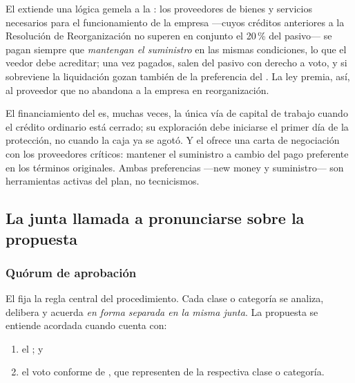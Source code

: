 El  extiende una lógica gemela a la : los proveedores
de bienes y servicios necesarios para el funcionamiento de la empresa ---cuyos créditos anteriores
a la Resolución de Reorganización no superen en conjunto el 20\,\% del pasivo--- se pagan
 siempre que \emph{mantengan el suministro} en
las mismas condiciones, lo que el veedor debe acreditar; una vez pagados, salen del pasivo con
derecho a voto, y si sobreviene la liquidación gozan también de la preferencia del 
. La ley premia, así, al proveedor que no abandona a la empresa en reorganización.

\begin{practica}
El financiamiento del  es, muchas veces, la única vía de capital de trabajo cuando el
crédito ordinario está cerrado; su exploración debe iniciarse el primer día de la protección, no
cuando la caja ya se agotó. Y el  ofrece una carta de negociación con los proveedores
críticos: mantener el suministro a cambio del pago preferente en los términos originales. Ambas
preferencias ---new money y suministro--- son herramientas activas del plan, no tecnicismos.
\end{practica}

\subsection{La junta llamada a pronunciarse sobre la propuesta}

\subsubsection{Quórum de aprobación}

El  fija la regla central del procedimiento. Cada clase o categoría se analiza,
delibera y acuerda \emph{en forma separada en la misma junta}. La propuesta se entiende
acordada cuando cuenta con:

\begin{enumerate}
  \item el ; y
  \item el voto conforme de , que
  representen  de la
  respectiva clase o categoría.
\end{enumerate}

